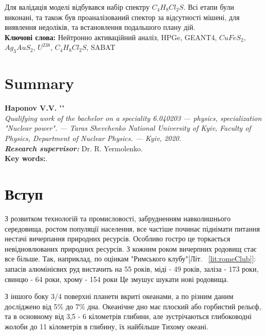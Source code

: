 \documentclass[a4paper, 14pt]{article}
\numberwithin{equation}{section}
\numberwithin{table}{section}
\begin{document}
Для валідація моделі відбувався набір спектру $C_4H_8Cl_2S$.
Всі етапи були виконані, та також був проаналізований спектор за відсутності мішені, для виявлення недоліків, та встановлення подальшого плану дій. \\
{\bf Ключові слова:} Нейтронно активаційний аналіз, HPGe, GEANT4, $CuFeS_2$, $Ag_3AuS_2$, $U^{238}$, $C_4H_8Cl_2S$, SABAT

\newpage
\thispagestyle{empty}
\section*{Summary}

{\bf Haponov V.V.} ""\\
{\itshape Qualifying work of the bachelor on a speciality 6.040203 --- physics, specialization "Nuclear power". --- Taras Shevchenko National University of Kyiv, Faculty of Physics, Department of Nuclear Physics. --- Kyiv, 2020.\\}
{\itshape \bfseries Research supervisor:} Dr. R. Yermolenko.
\\[0.5cm]
{\bf Key words:}.

\newpage
\tableofcontents
\newpage
\pagestyle{plain}
\setcounter{page}{2}
\newpage
\section{Вступ}

З розвитком технологій та промисловості, забрудненням навколишнього середовища, ростом популяції населення, все частіше починає піднімати питання нестачі вичерпання природних ресурсів. Особливо гостро це торкається невідновлюваних природних ресурсів. З кожним роком вичерпних родовищ стає все більше. Так, наприклад, по оцінкам "Римського клубу"[Літ. ~\ref{lit:romeClub}]: запасів алюмінієвих руд вистачить на 55 років, міді - 49 років, заліза - 173 роки, свинцю - 64 роки, хрому - 154 роки Це змушує шукати нові родовища.

З іншого боку 3/4 поверхні планети вкриті океанами, а по різним даним досліджено від 5\% до 7\% дна.
Океанічне дно має плоский або горбистий рельєф, та в основному від 3,5 - 6 кілометрів глибини, але зустрічаються глибоководні жолоби до 11 кілометрів в глибину, їх найбільше Тихому океані. 
\end{document}
